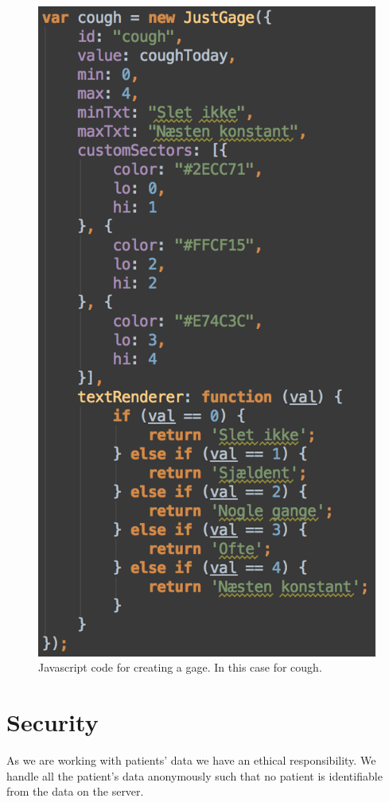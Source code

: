 \begin{figure}[h]
\centering
\includegraphics[scale=0.5]{images/implementation/gage.png}
\caption{Javascript code for creating a gage. In this case for cough.}
\label{fig:gage}
\end{figure}

 
\section{Security}
As we are working with patients' data we have an ethical responsibility. We handle all the patient's data anonymously such that no patient is identifiable from the data on the server.

